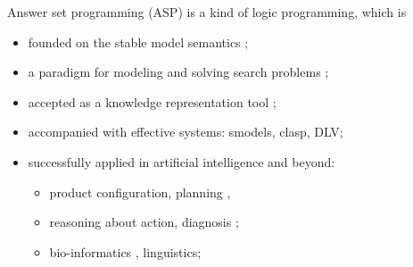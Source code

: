 \begin{frame}
Answer set programming (ASP) is a kind of logic programming, which is
  \begin{itemize}
    \item founded on the stable model semantics \cite{GelfondLifschitz88};
    \item a paradigm for modeling and solving search problems \cite{Baral:aspbook};
    \item accepted as a knowledge representation tool \cite{Brewka:CACM:2011};
    \item accompanied with effective systems: smodels, clasp, DLV;
    \item successfully applied in artificial intelligence and beyond:
    \pause
    \begin{itemize}
      \item product configuration, planning \cite{Lifschitz2002},
      \item reasoning about action, diagnosis \cite{Nogueiraetal2001};
      \item bio-informatics \cite{Gebser:TPLP:2011}, linguistics;
    \end{itemize}
  \end{itemize}
\end{frame}
%

